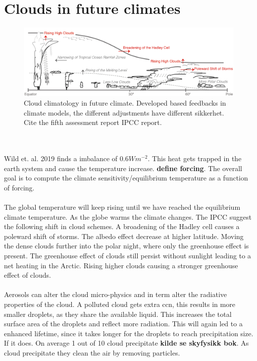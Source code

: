\section{Clouds in future climates}
\begin{figure}
    \centering
    \includegraphics[scale = 0.8]{Chapter1_Intro/Fig7-11_ipcc.jpg}
    \caption{Cloud climatology in future climate. Developed based feedbacks in climate models, the different adjustments have different sikkerhet. Cite the fifth assessment report IPCC report.}
    \label{fig:cloud_scheme}
\end{figure}
\\ \\
Wild et. al. 2019 finds a imbalance of $0.6W m^{-2}$. This heat gets trapped in the earth system and cause the temperature increase. \textbf{define forcing}. The overall goal is to compute the climate sensitivity/equilibrium temperature as a function of forcing. 
\\ \\ 
The global temperature will keep rising until we have reached the equilibrium climate temperature. As the globe warms the climate changes. The IPCC suggest the following shift in cloud schemes. A broadening of the Hadley cell causes a poleward shift of storms. The albedo effect decrease at higher latitude. Moving the dense clouds further into the polar night, where only the greenhouse effect is present. The greenhouse effect of clouds still persist without sunlight leading to a net heating in the Arctic. Rising higher clouds causing a stronger greenhouse effect of clouds.
\\ \\
Aerosols can alter the cloud micro-physics and in term alter the radiative properties of the cloud. A polluted cloud gets extra \acrshort{ccn}, this results in more smaller droplets, as they share the available liquid. This increases the total surface area of the droplets and reflect more radiation. This will again led to a enhanced lifetime, since it takes longer for the droplets to reach precipitation size. If it does. On average 1 out of 10 cloud precipitate \textbf{kilde se skyfysikk bok}. As cloud precipitate they clean the air by removing particles.
